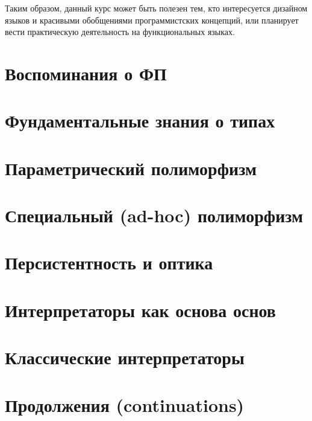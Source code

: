 \documentclass[12pt]{article}
\begin{document}
    Таким образом, данный курс может быть полезен тем, кто интересуется дизайном языков и красивыми обобщениями программистских концепций, или планирует вести практическую деятельность на функциональных языках.


    \clearpage


    \section{Воспоминания о ФП}

    

    \clearpage


    \section{Фундаментальные знания о типах}

    

    \clearpage


    \section{Параметрический полиморфизм}
%
%    
%


    \section{Специальный (ad-hoc) полиморфизм} \label{sec:ad-hoc}
%
%    
%


    \section{Персистентность и оптика}
%
%    
%


    \section{Интерпретаторы как основа основ}



    \section{Классические интерпретаторы}

%    
%


    \section{Продолжения (continuations)} \label{sec:continuations}
%
%    
%
\end{document}

